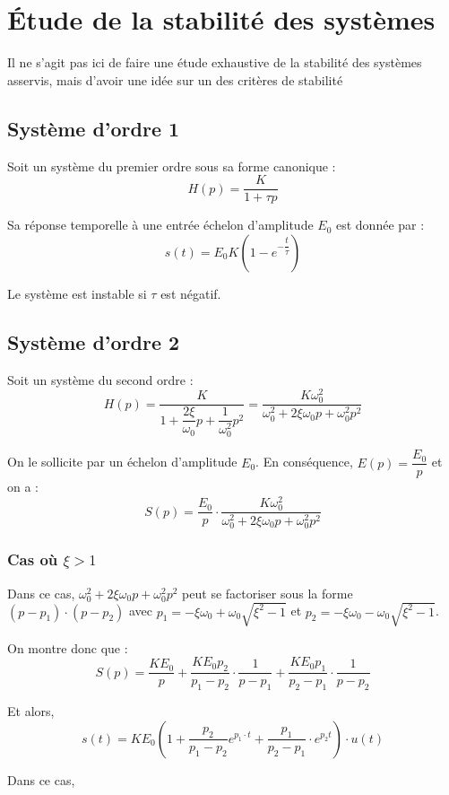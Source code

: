 \documentclass[10pt,oneside]{article}
\begin{document}
\section{Étude de la stabilité des systèmes}
Il ne s'agit pas ici de faire une étude exhaustive de la stabilité des systèmes asservis, mais d'avoir une idée sur un des critères de stabilité
\subsection{Système d'ordre 1}
Soit un système du premier ordre sous sa forme canonique :
$$
H(p)=\dfrac{K}{1+\tau p}
$$

Sa réponse temporelle à une entrée échelon d'amplitude $E_0$ est donnée par :
$$
s(t) = E_0 K \left(1-e^{-\dfrac{t}{\tau}}\right)
$$

Le système est instable si $\tau$ est négatif.

\subsection{Système d'ordre 2}
Soit un système du second ordre :
$$
H(p)
=\dfrac{K}{1+\dfrac{2\xi}{\omega_0} p+\dfrac{1}{\omega_0^2} p^2}
=\dfrac{K\omega_0^2}{\omega_0^2+2\xi\omega_0 p+\omega_0^2 p^2}
$$


On le sollicite par un échelon d'amplitude $E_0$. En conséquence, $E(p)=\dfrac{E_0}{p}$ et on a :
$$
S(p)=\dfrac{E_0}{p} \cdot \dfrac{K\omega_0^2}{\omega_0^2+2\xi\omega_0 p+\omega_0^2 p^2}
$$

\subsubsection{Cas où $\xi>1$}
Dans ce cas, $\omega_0^2+2\xi\omega_0 p+\omega_0^2 p^2$ peut se factoriser sous la forme $\left(p-p_1\right)\cdot\left(p-p_2\right)$ avec $p_1 = -\xi\omega_0 + \omega_0 \sqrt{\xi^2-1}$ et $p_2 = -\xi\omega_0 - \omega_0 \sqrt{\xi^2-1}$.

On montre donc que :
$$
S(p)= \dfrac{KE_0}{p} + \dfrac{KE_0 p_2}{p_1-p_2}\cdot \dfrac{1}{p-p_1}
+ \dfrac{KE_0 p_1}{p_2-p_1}\cdot \dfrac{1}{p-p_2}
$$

Et alors, 
$$
s(t) = KE_0\left(1+ \dfrac{ p_2}{p_1-p_2} e^{p_1 \cdot t} + \dfrac{p_1}{p_2-p_1}\cdot e^{p_2 t} \right) \cdot u(t)
$$


Dans ce cas, 
\end{document}
